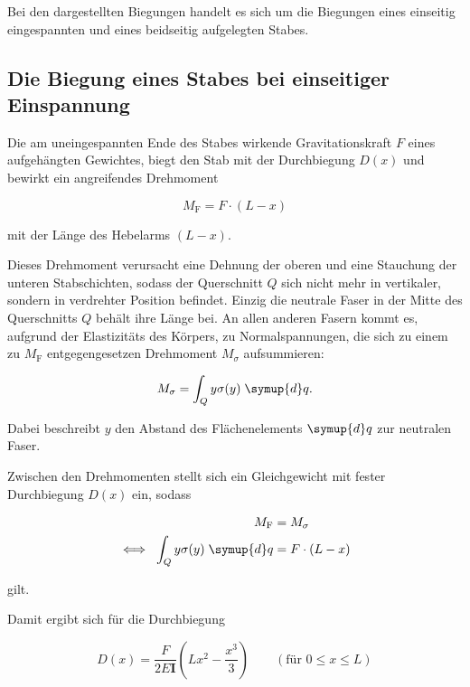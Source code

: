 Bei den dargestellten Biegungen handelt es sich um die Biegungen eines einseitig
eingespannten und eines beidseitig aufgelegten Stabes.

\subsection{Die Biegung eines Stabes bei einseitiger Einspannung}

Die am uneingespannten Ende des Stabes wirkende Gravitationskraft $F$ eines 
aufgehängten Gewichtes, biegt den Stab mit der Durchbiegung $D(x)$ und
bewirkt ein angreifendes Drehmoment

\begin{equation*}
    M_\text{F} = F \cdot (L - x)
\end{equation*}

mit der Länge des Hebelarms $(L - x)$.

Dieses Drehmoment verursacht eine Dehnung der oberen und eine Stauchung
der unteren Stabschichten, sodass der Querschnitt $Q$ sich nicht mehr in vertikaler,
sondern in verdrehter Position befindet. Einzig die neutrale Faser in der Mitte
des Querschnitts $Q$ behält ihre Länge bei. An allen anderen Fasern kommt es,
aufgrund der Elastizitäts des Körpers, zu Normalspannungen, die sich zu einem
zu $M_\text{F}$ entgegengesetzen Drehmoment $M_\sigma$ aufsummieren:

\begin{equation*}
    M_\sigma = \int_Q y \sigma(y) \; \symup{d}q.
\end{equation*}

Dabei beschreibt $y$ den Abstand des Flächenelements $\symup{d}q$ zur neutralen Faser.

Zwischen den Drehmomenten stellt sich ein Gleichgewicht mit fester
Durchbiegung $D(x)$ ein, sodass 

\begin{align*}
    M_\text{F} &= M_\sigma \\
    \iff \; \int_Q y \sigma(y) \; \symup{d}q &= F \cdot (L - x)
\end{align*}

gilt.

Damit ergibt sich für die Durchbiegung

\begin{equation}
    D(x) = \frac{F}{2 E \symbf{I}} \left(L x^2 - \frac{x^3}{3} \right) 
    \qquad (\text{für } 0 \leq x \leq L)
    \label{eqn:Biegung}
\end{equation}

